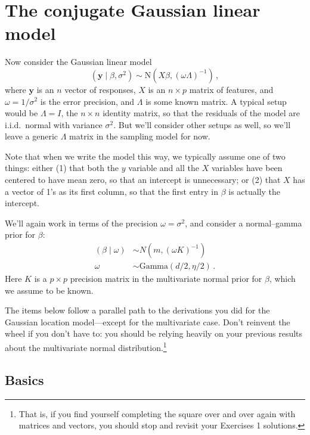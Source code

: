 \documentclass{mynotes}
\newcommand{\by}{\textbf{y}}
\newcommand{\N}{\mbox{N}}
\begin{document}
\newpage 

\section{The conjugate Gaussian linear model}

Now consider the Gaussian linear model
$$
(\by \mid \beta, \sigma^2) \sim \N(X\beta, (\omega \Lambda)^{-1} ) \, ,
$$
where $\by$ is an $n$ vector of responses, $X$ is an $n \times p$ matrix of features, and $\omega = 1/\sigma^2$ is the error precision, and $\Lambda$ is some known matrix.  A typical setup would be $\Lambda = I$, the $n \times n$ identity matrix, so that the residuals of the model are i.i.d.~normal with variance $\sigma^2$.  But we'll consider other setups as well, so we'll leave a generic $\Lambda$ matrix in the sampling model for now.

Note that when we write the model this way, we typically assume one of two things: either (1) that both the $y$ variable and all the $X$ variables have been centered to have mean zero, so that an intercept is unnecessary; or (2) that $X$ has a vector of 1's as its first column, so that the first entry in $\beta$ is actually the intercept.

We'll again work in terms of the precision $\omega = \sigma^2$, and consider a normal--gamma prior for $\beta$:
\begin{align}
(\beta \mid \omega) &\sim N(m, (\omega K)^{-1}) \\
\omega &\sim \mbox{Gamma}(d/2, \eta/2) \, .
\end{align}
Here $K$ is a $p \times p$ precision matrix in the multivariate normal prior for $\beta$, which we assume to be known.

The items below follow a parallel path to the derivations you did for the Gaussian location model---except for the multivariate case.  Don't reinvent the wheel if you don't have to: you should be relying heavily on your previous results about the multivariate normal distribution.\footnote{That is, if you find yourself completing the square over and over again with matrices and vectors, you should stop and revisit your Exercises 1 solutions.}

\subsection{Basics}
\end{document}
